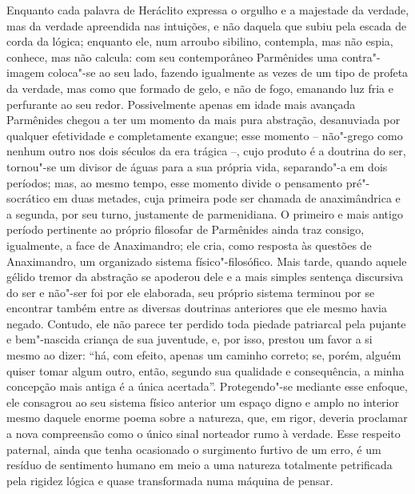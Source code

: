 \sectionitem

Enquanto cada palavra de Heráclito expressa o orgulho e a
majestade da verdade, mas da verdade apreendida nas intuições, e não
daquela que subiu pela escada de corda da lógica; enquanto ele, num
arroubo sibilino, contempla, mas não espia, conhece, mas não calcula:
com seu contemporâneo Parmênides uma contra"-imagem coloca"-se \label{comseucontemporaneo}
ao seu lado, fazendo igualmente as vezes de um tipo de profeta da
verdade, mas como que formado de gelo, e não de fogo, emanando luz fria
e perfurante ao seu redor. Possivelmente apenas em idade mais
avançada Parmênides chegou a ter um momento da mais pura abstração,
desanuviada por qualquer efetividade e completamente exangue; esse momento --
não"-grego como nenhum outro nos dois séculos da
era trágica --, cujo produto é a doutrina do ser, tornou"-se um divisor
de águas para a sua própria vida, separando"-a em dois períodos; mas, ao
mesmo tempo, esse momento divide o pensamento pré"-socrático em duas
metades, cuja primeira pode ser chamada de anaximândrica e a
segunda, por seu turno, justamente de parmenidiana. O primeiro e mais
antigo período pertinente ao próprio filosofar de Parmênides ainda traz
consigo, igualmente, a face de Anaximandro; ele cria, como resposta às
questões de Anaximandro, um organizado sistema físico"-filosófico. Mais
tarde, quando aquele gélido tremor da abstração se apoderou dele e a
mais simples sentença discursiva do ser e não"-ser foi por ele
elaborada, seu próprio sistema terminou por se encontrar também entre as diversas
doutrinas anteriores que ele mesmo havia negado. Contudo, ele não
parece ter perdido toda piedade patriarcal pela pujante e bem"-nascida
criança de sua juventude, e, por isso, prestou um favor a si mesmo ao
dizer: ``há, com efeito, apenas um caminho correto; se, porém, alguém
quiser tomar algum outro, então, segundo sua qualidade e
consequência, a minha concepção mais antiga é a única acertada''.
Protegendo"-se mediante esse enfoque, ele consagrou ao seu sistema
físico anterior um espaço digno e amplo no interior mesmo daquele
enorme poema sobre a natureza, que, em rigor, deveria proclamar a nova
compreensão como o único sinal norteador rumo à verdade. Esse respeito
paternal, ainda que tenha ocasionado o surgimento furtivo de um erro, é
um resíduo de sentimento humano em meio a uma natureza totalmente
petrificada pela rigidez lógica e quase transformada numa máquina de pensar.

